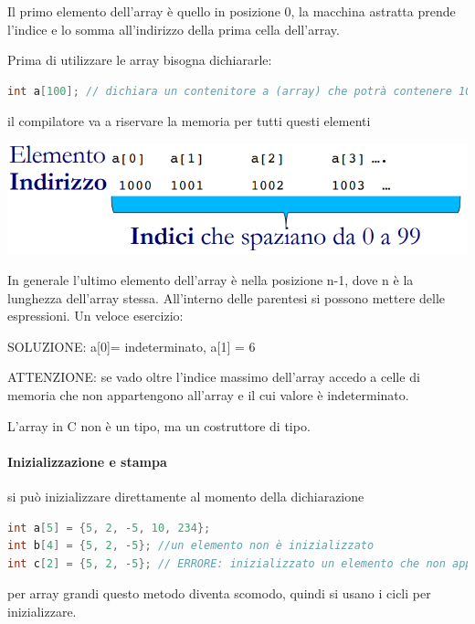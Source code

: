 \documentclass[
  paper=a4,
  oneside  ,captions=tableheading
]{scrbook}
\begin{document}
Il primo elemento dell'array è quello in posizione 0, la macchina
astratta prende l'indice e lo somma all'indirizzo della prima cella
dell'array.

Prima di utilizzare le array bisogna dichiararle:

\begin{lstlisting}[language={C++}]
int a[100]; // dichiara un contenitore a (array) che potrà contenere 100 elementi di tipo int, il primo elemento lo si trova in a[0], l'ultimo in a[99]
\end{lstlisting}

il compilatore va a riservare la memoria per tutti questi elementi

\includegraphics{./image/image-20201208144533768-1607774562526.png}

In generale l'ultimo elemento dell'array è nella posizione n-1, dove n è
la lunghezza dell'array stessa. All'interno delle parentesi si possono
mettere delle espressioni. Un veloce esercizio:

SOLUZIONE: a{[}0{]}= indeterminato, a{[}1{]} = 6

ATTENZIONE: se vado oltre l'indice massimo dell'array accedo a celle di
memoria che non appartengono all'array e il cui valore è indeterminato.

L'array in C non è un tipo, ma un costruttore di tipo.

\hypertarget{inizializzazione-e-stampa}{%
\paragraph{Inizializzazione e stampa}\label{inizializzazione-e-stampa}}

si può inizializzare direttamente al momento della dichiarazione

\begin{lstlisting}[language={C++}]
int a[5] = {5, 2, -5, 10, 234};
int b[4] = {5, 2, -5}; //un elemento non è inizializzato
int c[2] = {5, 2, -5}; // ERRORE: inizializzato un elemento che non appartiene all'array
\end{lstlisting}

per array grandi questo metodo diventa scomodo, quindi si usano i cicli
per inizializzare.
\end{document}
